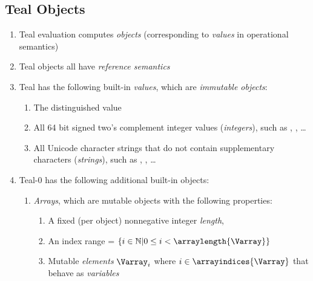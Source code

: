 \subsection{Teal Objects}

\begin{enumerate}
\item Teal evaluation computes \emph{objects} (corresponding to \emph{values} in operational semantics)
\item Teal objects all have \emph{reference semantics}
\item Teal has the following built-in \emph{values}, which are \emph{immutable objects}:
  \begin{enumerate}
  \item The distinguished value \Vnull{}
  \item All 64 bit signed two's complement integer values (\emph{integers}), such as , , \ldots
  \item All Unicode character strings that do not contain supplementary characters (\emph{strings}), such as , , \ldots
  \end{enumerate}
\item Teal-0 has the following additional built-in objects:
\begin{enumerate}
\item \emph{Arrays}, which are mutable objects with the following properties:
  \begin{enumerate}
  \item A fixed (per object) nonnegative integer \emph{length}, \arraylength{\Varray}
  \item An index range \arrayindices{\Varray} = $\{i \in \mathbb{N} | 0 \le i < \arraylength{\Varray}\}$
  \item Mutable \emph{elements} $\Varray_i$ where $i \in \arrayindices{\Varray}$ that behave as \emph{variables}
  \end{enumerate}
\end{enumerate}
\end{enumerate}

